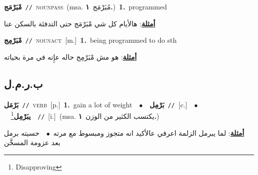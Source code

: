 \documentclass[10pt,a4paper,twoside]{article} %
\begin{document}
\begin{multicols}{2}
{\setlength\topsep{0pt}\textbf{\foreignlanguage{arabic}{مْبَرْمَج}}\ {\color{gray}\texttt{//}\color{black}}\ \textsc{noun\textunderscore pass}\ \color{gray}(msa. \foreignlanguage{arabic}{مُبَرْمَج}~\foreignlanguage{arabic}{\textbf{١.}})\color{black}\ \textbf{1.}~programmed\  \begin{flushright}\color{gray}\foreignlanguage{arabic}{\textbf{\underline{\foreignlanguage{arabic}{أمثلة}}}: هالأيام كل شي مْبَرْمَج حتى التدفئة بالسكن عنا}\end{flushright}\color{black}} \vspace{2mm}

{\setlength\topsep{0pt}\textbf{\foreignlanguage{arabic}{مْبَرْمِج}}\ {\color{gray}\texttt{//}\color{black}}\ \textsc{noun\textunderscore act}\ [m.]\ \textbf{1.}~being programmed to do sth\  \begin{flushright}\color{gray}\foreignlanguage{arabic}{\textbf{\underline{\foreignlanguage{arabic}{أمثلة}}}: هو مش مْبَرْمِج حاله عإِنه في مرة بحياته}\end{flushright}\color{black}} \vspace{2mm}

\vspace{-3mm}
\subsection*{\color{blue}\foreignlanguage{arabic}{ب.ر.م.ل}\color{blue}{}} 

{\setlength\topsep{0pt}\textbf{\foreignlanguage{arabic}{بَرْمَل}}\ {\color{gray}\texttt{//}\color{black}}\ \textsc{verb}\ [p.]\ \textbf{1.}~gain a lot of weight\ \ $\bullet$\ \ \setlength\topsep{0pt}\textbf{\foreignlanguage{arabic}{بَرْمِل}}\ {\color{gray}\texttt{//}\color{black}}\ [c.]\ \ $\bullet$\ \ \setlength\topsep{0pt}\textbf{\foreignlanguage{arabic}{يبَرْمِل}}\footnote{Disapproving}\ \ {\color{gray}\texttt{//}\color{black}}\ [i.]\ \color{gray}(msa. \foreignlanguage{arabic}{يكتسب الكثير من الوزن}~\foreignlanguage{arabic}{\textbf{١.}})\color{black}\  \begin{flushright}\color{gray}\foreignlanguage{arabic}{\textbf{\underline{\foreignlanguage{arabic}{أمثلة}}}: لما يبرمل الزلمة اعرفي عالأكيد انه متجوز ومبسوط مع مرته\ $\bullet$\ \  حسيته برمل بعد عزومة المسخَّن}\end{flushright}\color{black}} \vspace{2mm}


\end{multicols}
\end{document}

